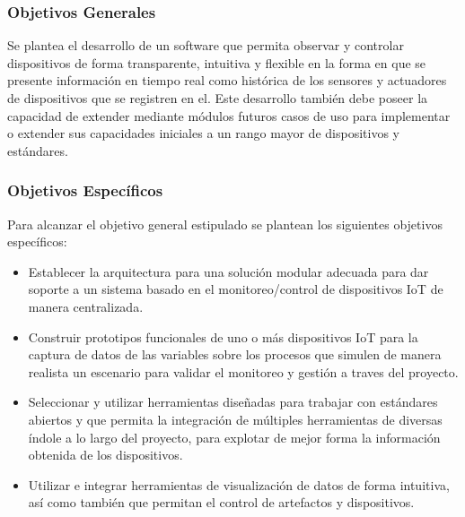 \subsubsection{Objetivos Generales}
Se plantea el desarrollo de un software que permita observar y controlar dispositivos de forma transparente, intuitiva y flexible en la forma en que se presente información en tiempo real como histórica de los sensores y actuadores de dispositivos que se registren en el. Este desarrollo también debe poseer la capacidad de extender mediante módulos futuros casos de uso para implementar o extender sus capacidades iniciales a un rango mayor de dispositivos y estándares.

\subsubsection{Objetivos Específicos}
Para alcanzar el objetivo general estipulado se plantean los siguientes objetivos específicos:
\begin{itemize} 
\item Establecer la arquitectura para una solución modular adecuada para dar soporte a un sistema basado en el monitoreo/control de dispositivos IoT de manera centralizada.
\item Construir prototipos funcionales de uno o más dispositivos IoT para la captura de datos de las variables sobre los procesos que simulen de manera realista un escenario para validar el monitoreo y gestión a traves del proyecto.
\item Seleccionar y utilizar herramientas diseñadas para trabajar con estándares abiertos y que permita la integración de múltiples herramientas de diversas índole a lo largo del proyecto, para explotar de mejor forma la información obtenida de los dispositivos.
\item Utilizar e integrar herramientas de visualización de datos de forma intuitiva, así como también que permitan el control de artefactos y dispositivos.
\end{itemize}
